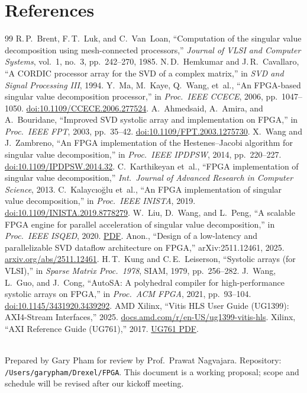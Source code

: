 \documentclass[11pt,letterpaper]{article}
\newcommand{\ttp}[1]{\texttt{\small #1}}
\begin{document}
\section*{References}

\begin{thebibliography}{99}
\small
{} R.\,P.~Brent, F.\,T.~Luk, and C.~Van~Loan, ``Computation of the singular value decomposition using mesh-connected processors,'' \emph{Journal of VLSI and Computer Systems}, vol.~1, no.~3, pp.~242--270, 1985.
 N.\,D.~Hemkumar and J.\,R.~Cavallaro, ``A CORDIC processor array for the SVD of a complex matrix,'' in \emph{SVD and Signal Processing III}, 1994.
 Y.~Ma, M.~Kaye, Q.~Wang, et~al., ``An FPGA-based singular value decomposition processor,'' in \emph{Proc.\ IEEE CCECE}, 2006, pp.~1047--1050. \href{https://doi.org/10.1109/CCECE.2006.277524}{doi:10.1109/CCECE.2006.277524}.
 A.~Ahmedsaid, A.~Amira, and A.~Bouridane, ``Improved SVD systolic array and implementation on FPGA,'' in \emph{Proc.\ IEEE FPT}, 2003, pp.~35--42. \href{https://doi.org/10.1109/FPT.2003.1275730}{doi:10.1109/FPT.2003.1275730}.
 X.~Wang and J.~Zambreno, ``An FPGA implementation of the Hestenes--Jacobi algorithm for singular value decomposition,'' in \emph{Proc.\ IEEE IPDPSW}, 2014, pp.~220--227. \href{https://doi.org/10.1109/IPDPSW.2014.32}{doi:10.1109/IPDPSW.2014.32}.
 C.~Karthikeyan et~al., ``FPGA implementation of singular value decomposition,'' \emph{Int.\ Journal of Advanced Research in Computer Science}, 2013.
 C.~Kalayc{\i}o\u{g}lu et~al., ``An FPGA implementation of singular value decomposition,'' in \emph{Proc.\ IEEE INISTA}, 2019. \href{https://doi.org/10.1109/INISTA.2019.8778279}{doi:10.1109/INISTA.2019.8778279}.
 W.~Liu, D.~Wang, and L.~Peng, ``A scalable FPGA engine for parallel acceleration of singular value decomposition,'' in \emph{Proc.\ IEEE ISQED}, 2020. \href{https://web.ece.ucsb.edu/~lip/publications/FPGA-SVD-IEEE-ISQED2020.pdf}{PDF}.
 Anon., ``Design of a low-latency and parallelizable SVD dataflow architecture on FPGA,'' arXiv:2511.12461, 2025. \href{https://arxiv.org/abs/2511.12461}{arxiv.org/abs/2511.12461}.
 H.\,T.~Kung and C.\,E.~Leiserson, ``Systolic arrays (for VLSI),'' in \emph{Sparse Matrix Proc.\ 1978}, SIAM, 1979, pp.~256--282.
 J.~Wang, L.~Guo, and J.~Cong, ``AutoSA: A polyhedral compiler for high-performance systolic arrays on FPGA,'' in \emph{Proc.\ ACM FPGA}, 2021, pp.~93--104. \href{https://doi.org/10.1145/3431920.3439292}{doi:10.1145/3431920.3439292}.
 AMD Xilinx, ``Vitis HLS User Guide (UG1399): AXI4-Stream Interfaces,'' 2025. \href{https://docs.amd.com/r/en-US/ug1399-vitis-hls}{docs.amd.com/r/en-US/ug1399-vitis-hls}.
 Xilinx, ``AXI Reference Guide (UG761),'' 2017. \href{https://www.xilinx.com/support/documents/ip_documentation/axi_ref_guide/latest/ug761_axi_reference_guide.pdf}{UG761 PDF}.
\end{thebibliography}

\vspace{1em}
\noindent\hrulefill\\[0.4em]
{\footnotesize Prepared by Gary Pham for review by Prof.\ Prawat Nagvajara. Repository: \ttp{/Users/garypham/Drexel/FPGA}. This document is a working proposal; scope and schedule will be revised after our kickoff meeting.}
\end{document}
